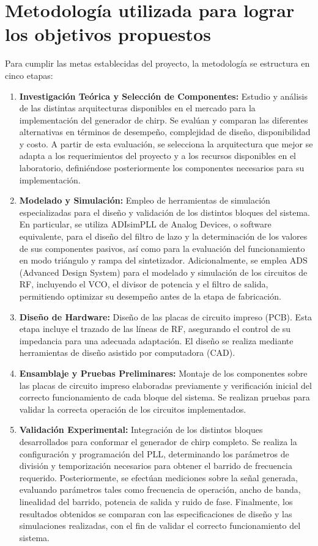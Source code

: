 \section{Metodología utilizada para lograr los objetivos propuestos}
Para cumplir las metas establecidas del proyecto, la metodología se estructura en cinco etapas:
\begin{enumerate}
    \item \textbf{Investigación Teórica y Selección de Componentes:} Estudio y análisis de las distintas arquitecturas disponibles en el mercado para la implementación del generador de chirp. Se evalúan y comparan las diferentes alternativas en términos de desempeño, complejidad de diseño, disponibilidad y costo. A partir de esta evaluación, se selecciona la arquitectura que mejor se adapta a los requerimientos del proyecto y a los recursos disponibles en el laboratorio, definiéndose posteriormente los componentes necesarios para su implementación.
    
    \item \textbf{Modelado y Simulación:} Empleo de herramientas de simulación especializadas para el diseño y validación de los distintos bloques del sistema. En particular, se utiliza ADIsimPLL de Analog Devices, o software equivalente, para el diseño del filtro de lazo y la determinación de los valores de sus componentes pasivos, así como para la evaluación del funcionamiento en modo triángulo y rampa del sintetizador. Adicionalmente, se emplea ADS (Advanced Design System) para el modelado y simulación de los circuitos de RF, incluyendo el VCO, el divisor de potencia y el filtro de salida, permitiendo optimizar su desempeño antes de la etapa de fabricación.
 
    \item \textbf{Diseño de Hardware:} Diseño de las placas de circuito impreso (PCB). Esta etapa incluye el trazado de las líneas de RF, asegurando el control de su impedancia para una adecuada adaptación. El diseño se realiza mediante herramientas de diseño asistido por computadora (CAD).
 
    \item \textbf{Ensamblaje y Pruebas Preliminares:} Montaje de los componentes sobre las placas de circuito impreso elaboradas previamente y verificación inicial del correcto funcionamiento de cada bloque del sistema. Se realizan pruebas para validar la correcta operación de los circuitos implementados.
    
    \item \textbf{Validación Experimental:} Integración de los distintos bloques desarrollados para conformar el generador de chirp completo. Se realiza la configuración y programación del PLL, determinando los parámetros de división y temporización necesarios para obtener el barrido de frecuencia requerido. Posteriormente, se efectúan mediciones sobre la señal generada, evaluando parámetros tales como frecuencia de operación, ancho de banda, linealidad del barrido, potencia de salida y ruido de fase. Finalmente, los resultados obtenidos se comparan con las especificaciones de diseño y las simulaciones realizadas, con el fin de validar el correcto funcionamiento del sistema.
\end{enumerate}

